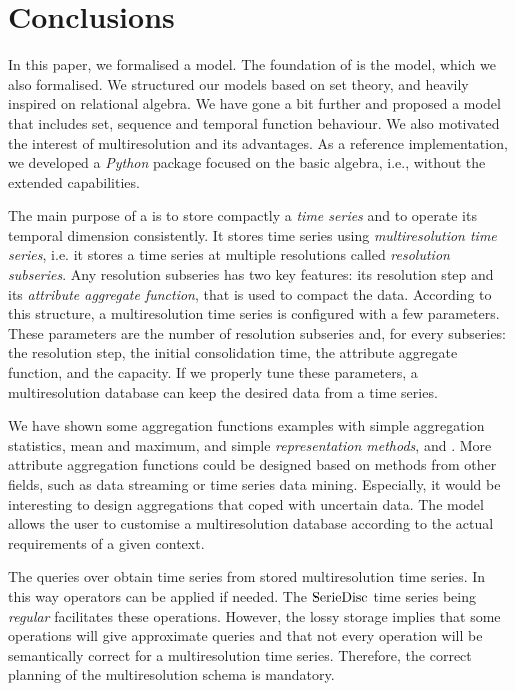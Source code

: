 \section{Conclusions}
\label{sec:concl-future-work}

In this paper, we formalised a  model. The foundation of
 is the  model, which we also formalised.  We
structured our models based on set theory, and heavily inspired on
relational algebra. We have gone a bit further and proposed a
 model that includes set, sequence and temporal function
behaviour. We also motivated the interest of multiresolution and its
advantages.  As a reference implementation, we developed a
\emph{Python} package focused on the basic algebra, i.e., without the
extended  capabilities.


The main purpose of a  is to store compactly a \emph{time
  series} and to operate its temporal dimension consistently.  It
stores time series using \emph{multiresolution time series}, i.e. it
stores a time series at multiple resolutions called \emph{resolution
  subseries}. Any resolution subseries has two key features: its
resolution step and its \emph{attribute aggregate function}, that is
used to compact the data. According to this structure, a
multiresolution time series is configured with a few parameters. These
parameters are the number of resolution subseries and, for every
subseries: the resolution step, the initial consolidation time, the
attribute aggregate function, and the capacity.  If we properly tune
these parameters, a multiresolution database can keep the desired
data from a time series.


We have shown some aggregation functions examples with simple
aggregation statistics, mean and maximum, and simple
\emph{representation methods}, \dd{} and \zohe{}. More attribute
aggregation functions could be designed based on methods from other
fields, such as data streaming or time series data mining. Especially,
it would be interesting to design aggregations that coped with
uncertain data.  The model allows the user to customise a
multiresolution database according to the actual requirements of a
given context.


The queries over  obtain time series from stored
multiresolution time series. In this way  operators can be
applied if needed. The $\operatorname{SerieDisc}$ time series being \emph{regular}
facilitates these operations. However, the lossy storage implies that
some operations will give approximate queries and that not
every  operation will be semantically correct for a
multiresolution time series. Therefore, the correct planning of the
multiresolution schema is mandatory.



